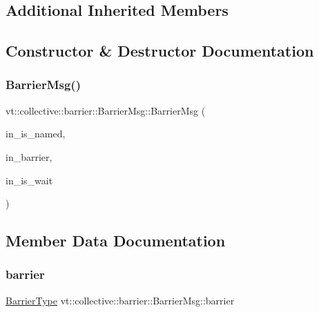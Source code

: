 \subsection*{Additional Inherited Members}


\subsection{Constructor \& Destructor Documentation}
\mbox{\label{structvt_1_1collective_1_1barrier_1_1_barrier_msg_ace4c557dedf54a63ed52ea92ff06a072}} 
\subsubsection{\texorpdfstring{Barrier\+Msg()}{BarrierMsg()}}
{\footnotesize\ttfamily vt\+::collective\+::barrier\+::\+Barrier\+Msg\+::\+Barrier\+Msg (\begin{DoxyParamCaption}\item[{bool const \&}]{in\+\_\+is\+\_\+named,  }\item[{\hyperlink{namespacevt_a25e481f0d6bbc7204db23d1c87a62e77}{Barrier\+Type} const \&}]{in\+\_\+barrier,  }\item[{bool const \&}]{in\+\_\+is\+\_\+wait }\end{DoxyParamCaption})\hspace{0.3cm}{\ttfamily [inline]}}



\subsection{Member Data Documentation}
\mbox{\label{structvt_1_1collective_1_1barrier_1_1_barrier_msg_ad07b4e665f05847318343b3b17e0c554}} 
\subsubsection{\texorpdfstring{barrier}{barrier}}
{\footnotesize\ttfamily \hyperlink{namespacevt_a25e481f0d6bbc7204db23d1c87a62e77}{Barrier\+Type} vt\+::collective\+::barrier\+::\+Barrier\+Msg\+::barrier}

